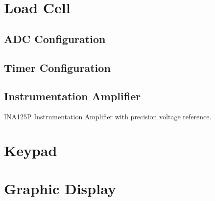 
\section{Load Cell}

\subsection{ADC Configuration}

\subsection{Timer Configuration}

\subsection{Instrumentation Amplifier}
INA125P Instrumentation Amplifier with precision voltage reference. \cite{INA125}

\section{Keypad}

\section{Graphic Display}

